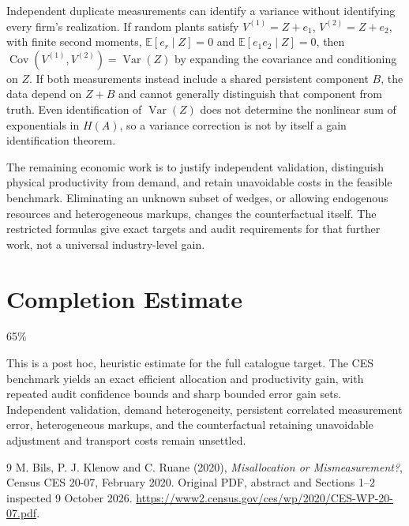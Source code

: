\documentclass[11pt]{article}
\theoremstyle{remark}\newtheorem{remark}[theorem]{Remark}
\newcommand{\E}{\mathbb E}
\newcommand{\Var}{\operatorname{Var}}
\newcommand{\Cov}{\operatorname{Cov}}
\begin{document}
Independent duplicate measurements can identify a variance without identifying every firm's realization. If random plants satisfy $V^{(1)}=Z+e_1$, $V^{(2)}=Z+e_2$, with finite second moments, $\E[e_r\mid Z]=0$ and $\E[e_1e_2\mid Z]=0$, then
$\Cov(V^{(1)},V^{(2)})=\Var(Z)$ by expanding the covariance and conditioning on $Z$. If both measurements instead include a shared persistent component $B$, the data depend on $Z+B$ and cannot generally distinguish that component from truth. Even identification of $\Var(Z)$ does not determine the nonlinear sum of exponentials in $H(A)$, so a variance correction is not by itself a gain identification theorem.

The remaining economic work is to justify independent validation, distinguish physical productivity from demand, and retain unavoidable costs in the feasible benchmark. Eliminating an unknown subset of wedges, or allowing endogenous resources and heterogeneous markups, changes the counterfactual itself. The restricted formulas give exact targets and audit requirements for that further work, not a universal industry-level gain.

\section{Completion Estimate}
65\%

This is a post hoc, heuristic estimate for the full catalogue target.
The CES benchmark yields an exact efficient allocation and productivity gain, with repeated audit confidence bounds and sharp bounded error gain sets. Independent validation, demand heterogeneity, persistent correlated measurement error, heterogeneous markups, and the counterfactual retaining unavoidable adjustment and transport costs remain unsettled.

\begin{thebibliography}{9}
 M. Bils, P. J. Klenow and C. Ruane (2020), \emph{Misallocation or Mismeasurement?}, Census CES 20-07, February 2020. Original PDF, abstract and Sections 1--2 inspected 9 October 2026. \url{https://www2.census.gov/ces/wp/2020/CES-WP-20-07.pdf}.
\end{thebibliography}
\end{document}
